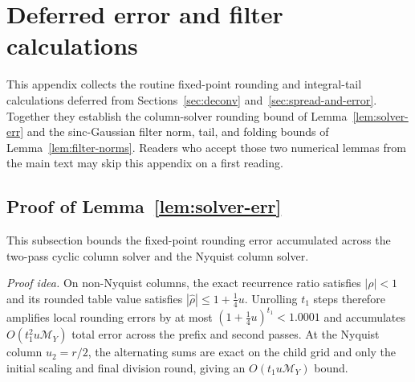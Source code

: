 \section{Deferred error and filter calculations}\label{app:deferred}

This appendix collects the routine fixed-point rounding and integral-tail calculations deferred from Sections~\ref{sec:deconv} and~\ref{sec:spread-and-error}. Together they establish the column-solver rounding bound of Lemma~\ref{lem:solver-err} and the sinc-Gaussian filter norm, tail, and folding bounds of Lemma~\ref{lem:filter-norms}. Readers who accept those two numerical lemmas from the main text may skip this appendix on a first reading.

\subsection{Proof of Lemma~\ref{lem:solver-err}}\label{app:solver-err-proof}

This subsection bounds the fixed-point rounding error accumulated across the two-pass cyclic column solver and the Nyquist column solver.

\medskip\noindent\emph{Proof idea.} On non-Nyquist columns, the exact recurrence ratio satisfies $|\rho| < 1$ and its rounded table value satisfies $|\hat{\rho}| \le 1 + \frac{1}{4}u$. Unrolling $t_1$ steps therefore amplifies local rounding errors by at most $(1 + \frac{1}{4}u)^{t_1} < 1.0001$ and accumulates $O(t_1^2 u \mathcal{M}_Y)$ total error across the prefix and second passes. At the Nyquist column $u_2 = r/2$, the alternating sums are exact on the child grid and only the initial scaling and final division round, giving an $O(t_1 u \mathcal{M}_Y)$ bound.

